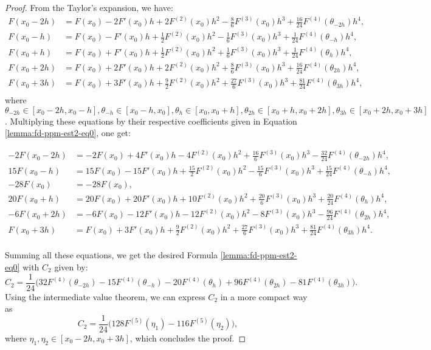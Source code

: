 \begin{proof}
From the Taylor's expansion, we have:
	\begin{align*}
		F(x_0-2h) &= F(x_0) - 2F'(x_0)h +           2F^{(2)}(x_0)h^2  - \frac{8}{6}F^{(3)}(x_0)h^3 + \frac{16}{24}F^{(4)}(\theta_{-2h})h^4,\\
		F(x_0-h)  &= F(x_0) -  F'(x_0)h +  \frac{1}{2}F^{(2)}(x_0)h^2 - \frac{1}{6}F^{(3)}(x_0)h^3 + \frac{1}{24}F^{(4)}(\theta_{-h})h^4, \\
		F(x_0+h)  &= F(x_0) +  F'(x_0)h +  \frac{1}{2}F^{(2)}(x_0)h^2 + \frac{1}{6}F^{(3)}(x_0)h^3 + \frac{1}{24}F^{(4)}(\theta_{h})h^4, \\
		F(x_0+2h) &= F(x_0) + 2F'(x_0)h +           2F^{(2)}(x_0)h^2  + \frac{8}{6}F^{(3)}(x_0)h^3 + \frac{16}{24}F^{(4)}(\theta_{2h})h^4,\\
		F(x_0+3h) &= F(x_0) + 3F'(x_0)h + \frac{9}{2}F^{(2)}(x_0)h^2  + \frac{27}{6}F^{(3)}(x_0)h^3+ \frac{81}{24}F^{(4)}(\theta_{3h})h^4,\\
	\end{align*}
	where $ \theta_{-2h}\in [x_0-2h,x_0-h], \theta_{-h}\in [x_0-h,x_0], \theta_{h} \in [x_0,x_0+h], 
	\theta_{2h} \in [x_0+h,x_0+2h], \theta_{3h}\in [x_0+2h,x_0+3h]$. 
	Multiplying these equations by their respective coefficients given in 
	Equation \eqref{lemma:fd-ppm-est2-eq0}, one get:
	
	\begin{align*}
		 -2F(x_0-2h) &=  -2F(x_0) + 4F'(x_0)h -          4F^{(2)}(x_0)h^2   + \frac{16}{6}F^{(3)}(x_0)h^3 - \frac{32}{24}F^{(4)}(\theta_{-2h})h^4,\\
		 15F(x_0-h)  &=  15F(x_0) -15F'(x_0)h + \frac{15}{2}F^{(2)}(x_0)h^2 - \frac{15}{6}F^{(3)}(x_0)h^3 + \frac{15}{24}F^{(4)}(\theta_{-h})h^4,\\
		-28F(x_0)    &= -28F(x_0),\\
		 20F(x_0+h)  &=  20F(x_0) +20F'(x_0)h +          10F^{(2)}(x_0)h^2  + \frac{20}{6}F^{(3)}(x_0)h^3 + \frac{20}{24}F^{(4)}(\theta_{h})h^4,\\
		 -6F(x_0+2h) &=  -6F(x_0) -12F'(x_0)h -          12F^{(2)}(x_0)h^2  -            8F^{(3)}(x_0)h^3 - \frac{96}{24}F^{(4)}(\theta_{2h})h^4,\\
		   F(x_0+3h) &=    F(x_0) + 3F'(x_0)h + \frac{9}{2}F^{(2)}(x_0)h^2  + \frac{27}{6}F^{(3)}(x_0)h^3 + \frac{81}{24}F^{(4)}(\theta_{3h})h^4.\\
	\end{align*}
	
	Summing all these equations, we get the desired Formula \eqref{lemma:fd-ppm-est2-eq0} with $C_2$ given by:
	\begin{equation}
		C_2 = \frac{1}{24}\bigg(32F^{(4)}(\theta_{-2h}) - 15F^{(4)}(\theta_{-h}) -20F^{(4)}(\theta_{h}) +96 F^{(4)}(\theta_{2h}) - 81F^{(4)}(\theta_{3h})\bigg).
	\end{equation}
Using the intermediate value theorem, we can express $C_2$ in a more compact way as
\begin{equation}
		\label{lemma:fd-ppm-est2-eq1}
	C_2 = \frac{1}{24}\bigg( 128F^{(5)}(\eta_{1}) -116F^{(5)}(\eta_{2})\bigg), 
\end{equation}
where $\eta_{1}, \eta_{2} \in [x_0-2h,x_0+3h]$, which concludes the proof.
\end{proof}


